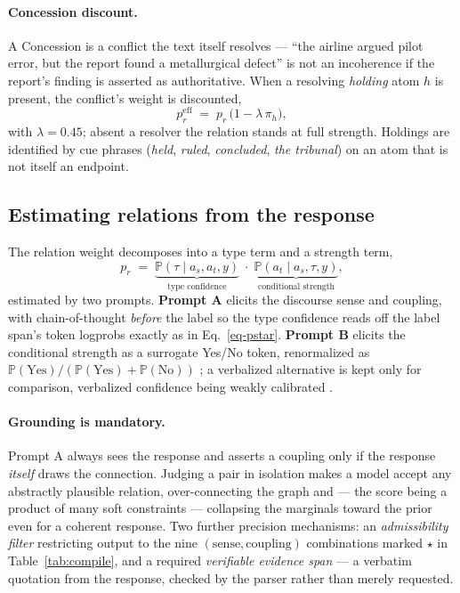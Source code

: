 \documentclass{article} %
\newcommand{\pr}[1]{\mathbb{P}\!\left( #1 \right)}
\newcommand{\sense}[1]{\textsf{#1}}             %
\begin{document}
\paragraph{Concession discount.} A \sense{Concession} is a conflict the text itself
resolves --- ``the airline argued pilot error, but the report found a metallurgical
defect'' is not an incoherence if the report's finding is asserted as authoritative. When a
resolving \emph{holding} atom $h$ is present, the conflict's weight is discounted,
\begin{equation}
p_r^{\text{eff}} \;=\; p_r\,\bigl(1-\lambda\,\pi_h\bigr),
\label{eq-concession}
\end{equation}
with $\lambda=0.45$; absent a resolver the relation stands at full strength. Holdings are
identified by cue phrases (\emph{held}, \emph{ruled}, \emph{concluded}, \emph{the tribunal})
on an atom that is not itself an endpoint.

\subsection{Estimating relations from the response}
\label{sec-mining}

The relation weight decomposes into a type term and a strength term,
\begin{equation}
p_r \;=\; \underbrace{\pr{\tau \mid a_s,a_t,y}}_{\text{type confidence}}\;\cdot\;
          \underbrace{\pr{a_t \mid a_s,\tau,y}}_{\text{conditional strength}},
\label{eq-decomp}
\end{equation}
estimated by two prompts. \textbf{Prompt A} elicits the discourse sense and coupling, with
chain-of-thought \emph{before} the label so the type confidence reads off the label span's token
logprobs exactly as in Eq.~\ref{eq-pstar}. \textbf{Prompt B} elicits the conditional strength as a
surrogate Yes/No token, renormalized as $\pr{\text{Yes}}/(\pr{\text{Yes}}+\pr{\text{No}})$
\citep{kadavath}; a verbalized alternative is kept only for comparison, verbalized confidence
being weakly calibrated \citep{xiong}.

\paragraph{Grounding is mandatory.} Prompt A always sees the response and asserts a coupling only
if the response \emph{itself} draws the connection. Judging a pair in isolation makes a model
accept any abstractly plausible relation, over-connecting the graph and --- the score being a
product of many soft constraints --- collapsing the marginals toward the prior even for a coherent
response. Two further precision mechanisms: an \emph{admissibility filter} restricting output to
the nine $(\text{sense},\text{coupling})$ combinations marked $\star$ in
Table~\ref{tab:compile}, and a required \emph{verifiable evidence span} --- a verbatim quotation
from the response, checked by the parser rather than merely requested.
\end{document}
